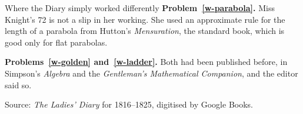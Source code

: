 \documentclass[11pt,a4paper]{article}
\begin{document}
\begin{diarynote}{Where the Diary simply worked differently}
\textbf{Problem~\ref{w-parabola}.} Miss Knight's 72 is not a slip in her working. She used
an approximate rule for the length of a parabola from Hutton's \textit{Mensuration},
the standard book, which is good only for flat parabolas.

\textbf{Problems~\ref{w-golden} and~\ref{w-ladder}.} Both had been published before, in
Simpson's \textit{Algebra} and the \textit{Gentleman's Mathematical Companion}, and the
editor said so.
\end{diarynote}

\vfill
{\small Source: \textit{The Ladies' Diary} for 1816--1825, digitised by Google Books.}
\end{document}
